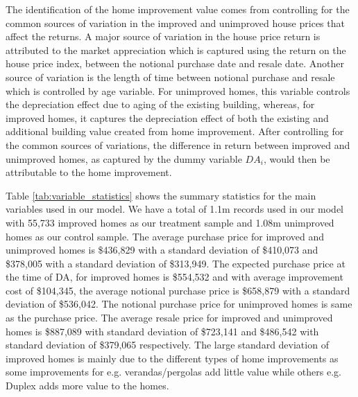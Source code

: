 \documentclass[AEJ,reqno, draftmode]{AEA} %
\begin{document}
The identification of the home improvement value comes from controlling for the common sources of variation in the improved and unimproved house prices that affect the returns. A major source of variation in the house price return is attributed to the market appreciation which is captured using the return on the house price index, between the notional purchase date and resale date. Another source of variation is the length of time between notional purchase and resale which is controlled by age variable. For unimproved homes, this variable controls the depreciation effect due to aging of the existing building, whereas, for improved homes, it captures the depreciation effect of both the existing and additional building value created from home improvement. After controlling for the common sources of variations, the difference in return between improved and unimproved homes, as captured by the dummy variable $DA_i$, would then be attributable to the home improvement.





Table \ref{tab:variable_statistics} shows the summary statistics for the main variables used in our model. We have a total of 1.1m records used in our model with 55,733 improved homes as our treatment sample and 1.08m unimproved homes as our control sample. The average purchase price for improved and unimproved homes is \$436,829 with a standard deviation of \$410,073 and \$378,005 with a standard deviation of \$313,949. The expected purchase price at the time of DA, for improved homes is \$554,532 and with average improvement cost of \$104,345, the average notional purchase price is \$658,879 with a standard deviation of \$536,042. The notional purchase price for unimproved homes is same as the purchase price. The average resale price for improved and unimproved homes is \$887,089 with standard deviation of \$723,141 and \$486,542 with standard deviation of \$379,065 respectively. The large standard deviation of improved homes is mainly due to the different types of home improvements as some improvements for e.g. verandas/pergolas add little value while others e.g. Duplex adds more value to the homes.
\end{document}
